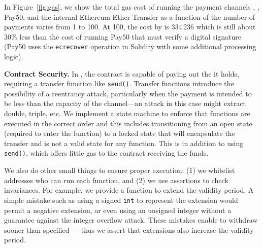 In Figure~\ref{fig:gas}, we show the total gas cost of running the payment channels \ew, \eww, \textsf{Pay50}, and the internal Ethereum Ether Transfer as a function of the number of payments varies from 1 to 100. At 100, the cost by \eww is 334\,236 which is still about 30\% less than the cost of running \textsf{Pay50} that must verify a digital signature (\eg \textsf{Pay50} uses the \texttt{ecrecover} operation in Solidity with some additional processing logic).

\textbf{Contract Security.} In \ew, the contract is capable of paying out the \eth it holds, requiring a transfer function like \texttt{send()}. Transfer functions introduce the possibility of a reentrancy attack, particularly when the payment is intended to be less than the capacity of the channel---\eg an attack in this case might extract double, triple, etc. We implement a state machine to enforce that functions are executed in the correct order and this includes transitioning from an open state (required to enter the function) to a locked state that will encapsulate the transfer and is not a valid state for any function. This is in addition to using \texttt{send()}, which offers little gas to the contract receiving the funds. %


We also do other small things to ensure proper execution: (1) we whitelist addresses who can run each function, and (2) we use assertions to check invariances. For example, we provide a function to extend the validity period. A simple mistake such as using a signed \texttt{int} to represent the extension would permit a negative extension, or even using an unsigned integer without a guarantee against the integer overflow attack. These mistakes enable \make to withdraw sooner than specified --- thus we assert that extensions also increase the validity period.

